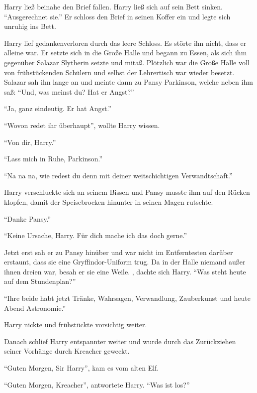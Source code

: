 Harry ließ beinahe den Brief fallen.  Harry ließ sich auf sein Bett sinken. \enquote{Ausgerechnet sie.} Er schloss den Brief in seinen Koffer ein und legte sich unruhig ins Bett.

\begin{traum}
Harry lief gedankenverloren durch das leere Schloss. Es störte ihn nicht, dass er alleine war. Er setzte sich in die Große Halle und begann zu Essen, als sich ihm gegenüber Salazar Slytherin setzte und mitaß. Plötzlich war die Große Halle voll von frühstückenden Schülern und selbst der Lehrertisch war wieder besetzt. Salazar sah ihn lange an und meinte dann zu Pansy Parkinson, welche neben ihm saß: \enquote{Und, was meinst du? Hat er Angst?}

\enquote{Ja, ganz eindeutig. Er hat Angst.}

\enquote{Wovon redet ihr überhaupt}, wollte Harry wissen.

\enquote{Von dir, Harry.}

\enquote{Lass mich in Ruhe, Parkinson.}

\enquote{Na na na, wie redest du denn mit deiner weitschichtigen Verwandtschaft.}

Harry verschluckte sich an seinem Bissen und Pansy musste ihm auf den Rücken klopfen, damit der Speisebrocken hinunter in seinen Magen rutschte.

\enquote{Danke \gst Pansy.}

\enquote{Keine Ursache, Harry. Für dich mache ich das doch gerne.}

Jetzt erst sah er zu Pansy hinüber und war nicht im Entferntesten darüber erstaunt, dass sie eine Gryffindor-Uniform trug. Da in der Halle niemand außer ihnen dreien war, besah er sie eine Weile. , dachte sich Harry. \enquote{Was steht heute auf dem Stundenplan?}

\enquote{Ihre beide habt jetzt Tränke, Wahrsagen, Verwandlung, Zauberkunst und heute Abend Astronomie.}

Harry nickte und frühstückte vorsichtig weiter.
\end{traum}

Danach schlief Harry entspannter weiter und wurde durch das Zurückziehen seiner Vorhänge durch Kreacher geweckt.

\enquote{Guten Morgen, Sir Harry}, kam es vom alten Elf.

\enquote{Guten Morgen, Kreacher}, antwortete Harry. \enquote{Was ist los?}

